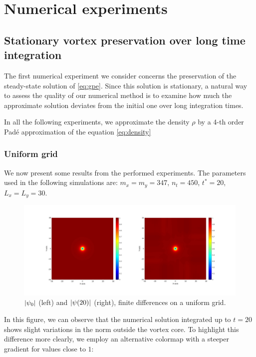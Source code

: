\chapter{Numerical experiments}

\section{Stationary vortex preservation over long time integration}

The first numerical experiment we consider concerns the preservation of the steady-state solution of \ref{eq:gpe}. Since this solution is stationary, a natural way to assess the quality of our numerical method is to examine how much the approximate solution deviates from the initial one over long integration times.

In all the following experiments, we approximate the density $\rho$ by a 4-th order Padé approximation of the equation \ref{eq:density}

\subsection{Uniform grid}

We now present some results from the performed experiments. The parameters used in the following simulations are: $m_x = m_y = 347$, $n_t = 450$, $t^* = 20$, $L_x = L_y = 30$.

\begin{figure}[H]
    \centering
    \includegraphics[width=\textwidth]{img/ltufd20t347s30L.pdf}
    \caption{$\left| \psi_0 \right|$ (left) and $\left| \psi(20) \right|$ (right), finite differences on a uniform grid.}
\end{figure}

In this figure, we can observe that the numerical solution integrated up to $t = 20$ shows slight variations in the norm outside the vortex core. To highlight this difference more clearly, we employ an alternative colormap with a steeper gradient for values close to $1$:

